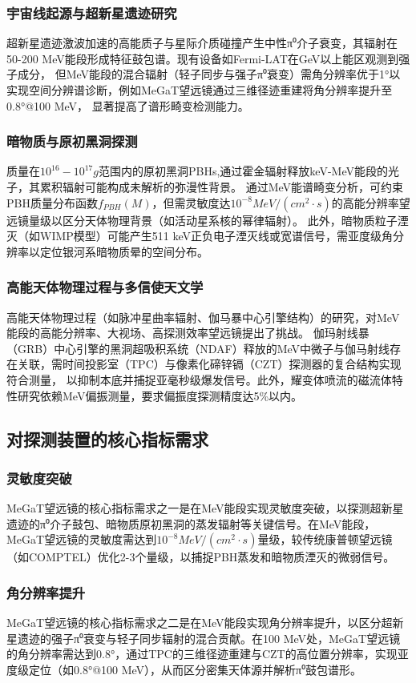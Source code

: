\subsubsection{宇宙线起源与超新星遗迹研究}
	超新星遗迹激波加速的高能质子与星际介质碰撞产生中性π⁰介子衰变，其辐射在50-200 MeV能段形成特征鼓包谱。现有设备如Fermi-LAT在GeV以上能区观测到强子成分，
	但MeV能段的混合辐射（轻子同步与强子π⁰衰变）需角分辨率优于1°以实现空间分辨谱诊断，例如MeGaT望远镜通过三维径迹重建将角分辨率提升至0.8°@100 MeV，
	显著提高了谱形畸变检测能力。
\subsubsection{暗物质与原初黑洞探测}
	质量在$10^{16}-10^{17}g$范围内的原初黑洞PBHs,通过霍金辐射释放keV-MeV能段的光子，其累积辐射可能构成未解析的弥漫性背景。
	通过MeV能谱畸变分析，可约束PBH质量分布函数$f_{PBH}(M)$，但需灵敏度达$10^{-8}MeV/(cm^2 \cdot s)$的高能分辨率望远镜量级以区分天体物理背景（如活动星系核的幂律辐射）。
	此外，暗物质粒子湮灭（如WIMP模型）可能产生511 keV正负电子湮灭线或宽谱信号，需亚度级角分辨率以定位银河系暗物质晕的空间分布。
\subsubsection{高能天体物理过程与多信使天文学}
	高能天体物理过程（如脉冲星曲率辐射、伽马暴中心引擎结构）的研究，对MeV能段的高能分辨率、大视场、高探测效率望远镜提出了挑战。
	伽玛射线暴（GRB）中心引擎的黑洞超吸积系统（NDAF）释放的MeV中微子与伽马射线存在关联，需时间投影室（TPC）与像素化碲锌镉（CZT）探测器的复合结构实现符合测量，
	以抑制本底并捕捉亚毫秒级爆发信号。此外，耀变体喷流的磁流体特性研究依赖MeV偏振测量，要求偏振度探测精度达5\%以内。
\subsection{对探测装置的核心指标需求}

\subsubsection{灵敏度突破}
	MeGaT望远镜的核心指标需求之一是在MeV能段实现灵敏度突破，以探测超新星遗迹的π⁰介子鼓包、暗物质原初黑洞的蒸发辐射等关键信号。在MeV能段，MeGaT望远镜的灵敏度需达到$10^{-8}MeV/(cm^2 \cdot s)$量级，较传统康普顿望远镜（如COMPTEL）优化2-3个量级，以捕捉PBH蒸发和暗物质湮灭的微弱信号。	
\subsubsection{角分辨率提升}
	MeGaT望远镜的核心指标需求之二是在MeV能段实现角分辨率提升，以区分超新星遗迹的强子π⁰衰变与轻子同步辐射的混合贡献。在100 MeV处，MeGaT望远镜的角分辨率需达到0.8°，通过TPC的三维径迹重建与CZT的高位置分辨率，实现亚度级定位（如0.8°@100 MeV），从而区分密集天体源并解析π⁰鼓包谱形。
